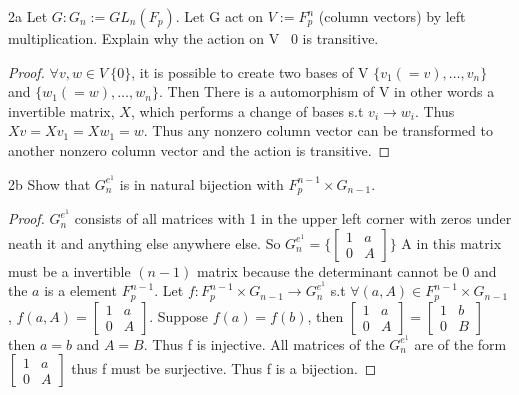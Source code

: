 \documentclass{article}
\begin{document}
\bigskip

\begin{claim}{2a}
    Let $G : G_n:= GL_n(F_p)$.  Let G act on $V := F_p^n$ (column vectors) by left multiplication. Explain why the action on V \ {0} is transitive. 
\end{claim}
\begin{proof}
    $\forall v, w \in V \ \{0\}$, it is possible to create two bases of V $\{v_1 (= v), \ldots, v_n\}$ and $\{w_1 (= w), \ldots, w_n\}$. Then There is a automorphism of V in other words a invertible matrix, $X$, which performs a change of bases s.t $v_i \to w_i$. Thus $Xv = Xv_1 = Xw_1 = w$. Thus any nonzero column vector can be transformed to another nonzero column vector and the action is transitive.
\end{proof}
\begin{claim}{2b}
    Show that $G_n^{e^1}$ is in natural bijection with $F_p^{n-1} \times G_{n-1}$.
\end{claim}
\begin{proof}
    $G_n^{e^1}$ consists of all matrices with 1 in the upper left corner with zeros under neath it and anything else anywhere else. So $G_n^{e^1} = \{\begin{bmatrix}
        1 & a\\
        0 & A
    \end{bmatrix}\}$ A in this matrix must be a invertible $(n - 1)$ matrix because the determinant cannot be 0 and the $a$ is a element $F_p^{n-1}$. Let $f : F_p^{n-1} \times G_{n-1} \to G_n^{e^1}$ s.t $\forall (a, A) \in F_p^{n-1} \times G_{n-1}$, $f(a, A) = \begin{bmatrix}
        1 & a\\
        0 & A
    \end{bmatrix}$. Suppose $f(a) = f(b)$, then $\begin{bmatrix}
        1 & a\\
        0 & A
    \end{bmatrix} = \begin{bmatrix}
        1 & b\\
        0 & B
    \end{bmatrix}$ then $a = b$ and $A = B$. Thus f is injective. All matrices of the $G_n^{e^1}$ are of the form $\begin{bmatrix}
        1 & a\\
        0 & A
    \end{bmatrix}$ thus f must be surjective. Thus f is a bijection.
\end{proof}
\end{document}

